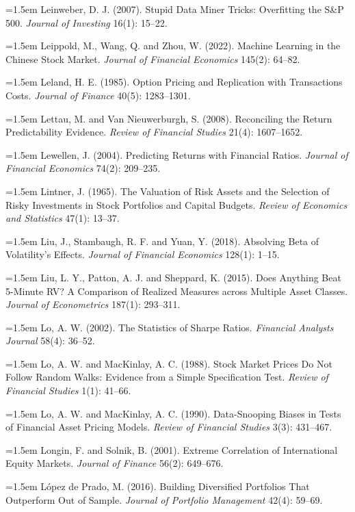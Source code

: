 \hangindent=1.5em Leinweber, D. J. (2007). Stupid Data Miner Tricks: Overfitting the S\&P 500. \emph{Journal of Investing} 16(1): 15--22.

\hangindent=1.5em Leippold, M., Wang, Q. and Zhou, W. (2022). Machine Learning in the Chinese Stock Market. \emph{Journal of Financial Economics} 145(2): 64--82.

\hangindent=1.5em Leland, H. E. (1985). Option Pricing and Replication with Transactions Costs. \emph{Journal of Finance} 40(5): 1283--1301.

\hangindent=1.5em Lettau, M. and Van Nieuwerburgh, S. (2008). Reconciling the Return Predictability Evidence. \emph{Review of Financial Studies} 21(4): 1607--1652.

\hangindent=1.5em Lewellen, J. (2004). Predicting Returns with Financial Ratios. \emph{Journal of Financial Economics} 74(2): 209--235.

\hangindent=1.5em Lintner, J. (1965). The Valuation of Risk Assets and the Selection of Risky Investments in Stock Portfolios and Capital Budgets. \emph{Review of Economics and Statistics} 47(1): 13--37.

\hangindent=1.5em Liu, J., Stambaugh, R. F. and Yuan, Y. (2018). Absolving Beta of Volatility's Effects. \emph{Journal of Financial Economics} 128(1): 1--15.

\hangindent=1.5em Liu, L. Y., Patton, A. J. and Sheppard, K. (2015). Does Anything Beat 5-Minute RV? A Comparison of Realized Measures across Multiple Asset Classes. \emph{Journal of Econometrics} 187(1): 293--311.

\hangindent=1.5em Lo, A. W. (2002). The Statistics of Sharpe Ratios. \emph{Financial Analysts Journal} 58(4): 36--52.

\hangindent=1.5em Lo, A. W. and MacKinlay, A. C. (1988). Stock Market Prices Do Not Follow Random Walks: Evidence from a Simple Specification Test. \emph{Review of Financial Studies} 1(1): 41--66.

\hangindent=1.5em Lo, A. W. and MacKinlay, A. C. (1990). Data-Snooping Biases in Tests of Financial Asset Pricing Models. \emph{Review of Financial Studies} 3(3): 431--467.

\hangindent=1.5em Longin, F. and Solnik, B. (2001). Extreme Correlation of International Equity Markets. \emph{Journal of Finance} 56(2): 649--676.

\hangindent=1.5em L\'opez de Prado, M. (2016). Building Diversified Portfolios That Outperform Out of Sample. \emph{Journal of Portfolio Management} 42(4): 59--69.


